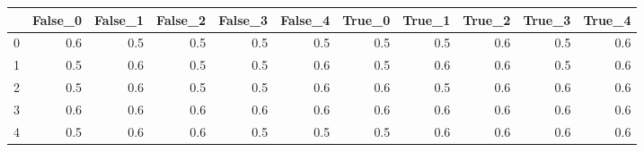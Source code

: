 \begin{tabular}{lrrrrrrrrrr}
\toprule
{} &  False\_0 &  False\_1 &  False\_2 &  False\_3 &  False\_4 &  True\_0 &  True\_1 &  True\_2 &  True\_3 &  True\_4 \\ \hline
\midrule
0 &      0.6 &      0.5 &      0.5 &      0.5 &      0.5 &     0.5 &     0.5 &     0.6 &     0.5 &     0.6 \\ \hline
1 &      0.5 &      0.6 &      0.5 &      0.5 &      0.6 &     0.5 &     0.6 &     0.6 &     0.5 &     0.6 \\ \hline
2 &      0.5 &      0.6 &      0.5 &      0.5 &      0.6 &     0.6 &     0.5 &     0.6 &     0.6 &     0.6 \\ \hline
3 &      0.6 &      0.6 &      0.6 &      0.6 &      0.6 &     0.6 &     0.6 &     0.6 &     0.6 &     0.6 \\ \hline
4 &      0.5 &      0.6 &      0.6 &      0.5 &      0.5 &     0.5 &     0.6 &     0.6 &     0.6 &     0.6 \\ \hline
\bottomrule
\end{tabular}
